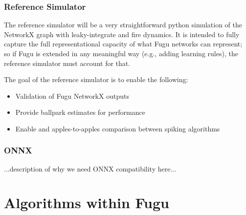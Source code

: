 \documentclass{article}
\begin{document}
\subsubsection{Reference Simulator}

The reference simulator will be a very straightforward python simulation of the NetworkX graph with leaky-integrate and fire dynamics.  It is intended to fully capture the full representational capacity of what Fugu networks can represent; so if Fugu is extended in any meaningful way (e.g., adding learning rules), the reference simulator must account for that.

The goal of the reference simulator is to enable the following:

\begin{itemize}
\item Validation of Fugu NetworkX outputs
\item Provide ballpark estimates for performance
\item Enable and apples-to-apples comparison between spiking algorithms

\end{itemize}

\subsubsection{ONNX}

...description of why we need ONNX compatibility here...


\section{Algorithms within Fugu}
\end{document}

